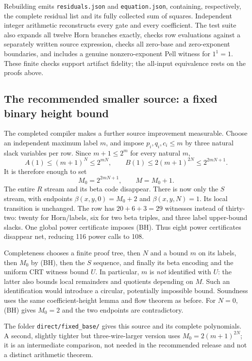 Rebuilding emits \texttt{residuals.json} and \texttt{equation.json}, containing,
respectively, the complete residual list and its fully collected sum of
squares. Independent integer arithmetic reconstructs every gate and every
coefficient. The test suite also expands all twelve Horn branches exactly,
checks row evaluations against a separately written source expression,
checks all zero-base and zero-exponent boundaries, and includes a genuine
nonzero-exponent Pell witness for $1^1=1$. These finite checks support
artifact fidelity; the all-input equivalence rests on the proofs above.

\subsection{The recommended smaller source: a fixed binary height bound}

The completed compiler makes a further source improvement measurable.
Choose an independent maximum label $m$, and impose
$p_i,q_i,c_i\leq m$ by three natural slack variables per row. Since
$m+1\leq2^m$ for every natural $m$,
\[
 A(1)\leq(m+1)^N\leq2^{mN},\qquad
 B(1)\leq2(m+1)^{2N}\leq2^{2mN+1}.
\]
It is therefore enough to set
\[
 M_0=2^{2mN+1},\qquad M=M_0+1.
 \tag{BH}
\]
The entire $R$ stream and its beta code disappear. There is now only the
$S$ stream, with endpoints $\beta(x,y,0)=M_0+2$ and
$\beta(x,y,N)=1$. Its local transition is unchanged. The row has
$20+6+3=29$ witnesses instead of thirty-two: twenty for Horn/labels,
six for two beta triples, and three label upper-bound slacks. One global
power certificate imposes (BH). Thus eight power certificates disappear
net, reducing 116 power calls to 108.

Completeness chooses a finite proof tree, then $N$ and a bound $m$ on
its labels, then $M_0$ by (BH), then the $S$ sequence, and finally its
beta encoding and the uniform CRT witness bound $U$. In particular,
$m$ is \emph{not} identified with $U$: the latter also bounds local
remainders and quotients depending on $M$. Such an identification would
introduce a circular, potentially impossible bound. Soundness uses the
same coefficient-height lemma and flow theorem as before. For $N=0$,
(BH) gives $M_0=2$ and the two endpoints are contradictory.

The folder \texttt{direct/fixed\_base/} gives this source and its complete
polynomials. A second, slightly tighter but three-wire-larger version
uses $M_0=2(m+1)^{2N}$; it is an intermediate comparison, not needed
in the recommended release and not a distinct arithmetic theorem.

